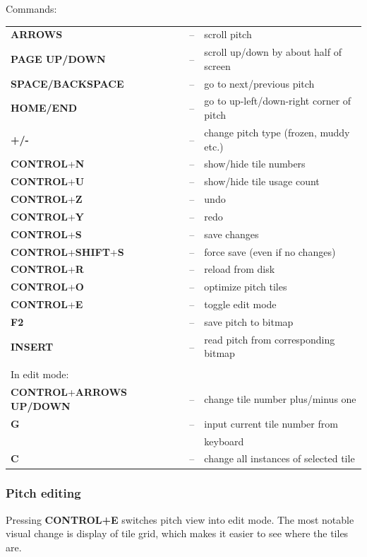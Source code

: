 \documentclass[a4paper,12pt]{article}
\begin{document}
\pagebreak
\begin{samepage}
\noindent Commands:

\vspace{\baselineskip}

\begin{longtable}{@{\extracolsep{\fill}}lll} 
{\bf ARROWS}            &--& scroll pitch\\
{\bf PAGE UP/DOWN}      &--& scroll up/down by about half of screen\\
{\bf SPACE/BACKSPACE}   &--& go to next/previous pitch\\
{\bf HOME/END}          &--& go to up-left/down-right corner of pitch\\
{\bf +/-}               &--& change pitch type (frozen, muddy etc.)\\
{\bf CONTROL}+{\bf N}   &--& show/hide tile numbers\\
{\bf CONTROL}+{\bf U}   &--& show/hide tile usage count\\
{\bf CONTROL}+{\bf Z}   &--& undo\\
{\bf CONTROL}+{\bf Y}   &--& redo\\
{\bf CONTROL}+{\bf S}   &--& save changes\\
{\bf CONTROL}+{\bf SHIFT}+{\bf S} &--& force save (even if no changes)\\
{\bf CONTROL}+{\bf R}   &--& reload from disk\\
{\bf CONTROL}+{\bf O}   &--& optimize pitch tiles\\
{\bf CONTROL}+{\bf E}   &--& toggle edit mode\\
{\bf F2}                &--& save pitch to bitmap\\
{\bf INSERT}            &--& read pitch from corresponding bitmap\\
& &\\
In edit mode:           &  &\\
{\bf CONTROL}+{\bf ARROWS UP/DOWN} &--& change tile number plus/minus one\\
{\bf G}          &--& input current tile number from\\
& &keyboard\\
{\bf C}          &--& change all instances of selected tile
\end{longtable}
\end{samepage}

\subsubsection{Pitch editing}\label{editingPitch}
Pressing {\bf CONTROL+E} switches pitch view into edit mode. The most notable visual change is display of tile grid, which makes it easier to see where the tiles are.
\end{document}
